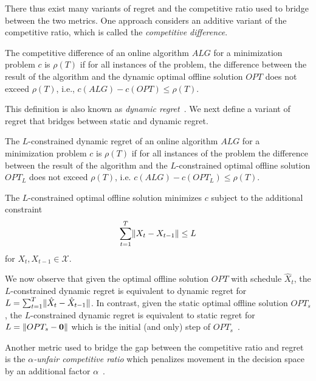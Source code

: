 There thus exist many variants of regret and the competitive ratio used to bridge between the two metrics. One approach considers an additive variant of the competitive ratio, which is called the \emph{competitive difference}.

\begin{definition}
\cite{Chen2015} The competitive difference of an online algorithm $ALG$ for a minimization problem $c$ is $\rho(T)$ if for all instances of the problem, the difference between the result of the algorithm and the dynamic optimal offline solution $OPT$ does not exceed $\rho(T)$, i.e., $c(ALG) - c(OPT) \leq \rho(T)$.
\end{definition}

This definition is also known as \emph{dynamic regret}~\cite{Chen2018}. We next define a variant of regret that bridges between static and dynamic regret.

\begin{definition}
\cite{Chen2018} The $L$-constrained dynamic regret of an online algorithm $ALG$ for a minimization problem $c$ is $\rho(T)$ if for all instances of the problem the difference between the result of the algorithm and the $L$-constrained optimal offline solution $OPT_L$ does not exceed $\rho(T)$, i.e. $c(ALG) - c(OPT_L) \leq \rho(T)$.

The $L$-constrained optimal offline solution minimizes $c$ subject to the additional constraint \begin{align*}
    \sum_{t=1}^T \lVert X_t - X_{t-1}\rVert \leq L
\end{align*} for $X_t, X_{t-1} \in \mathcal{X}$.
\end{definition}

We now observe that given the optimal offline solution $OPT$ with schedule $\hat{X}_t$, the $L$-constrained dynamic regret is equivalent to dynamic regret for $L = \sum_{t=1}^T \lVert\hat{X}_t - \hat{X}_{t-1}\rVert$. In contrast, given the static optimal offline solution $OPT_s$, the $L$-constrained dynamic regret is equivalent to static regret for $L = \lVert OPT_s - \mathbf{0}\rVert$ which is the initial (and only) step of $OPT_s$~\cite{Chen2018}.

Another metric used to bridge the gap between the competitive ratio and regret is the \emph{$\alpha$-unfair competitive ratio} which penalizes movement in the decision space by an additional factor $\alpha$~\cite{Andrew2015}.

